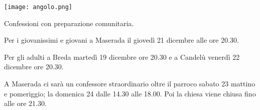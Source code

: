 \begin{minipage}{0.25\textwidth}
\texttt{[image: angolo.png]}
\end{minipage}
\hfill
\begin{minipage}{0.65\textwidth}
Confessioni con preparazione comunitaria.

Per i giovanissimi e giovani a Maserada il giovedì 21 dicembre alle ore 20.30.

Per gli adulti a Breda martedì 19 dicembre ore 20.30 e a Candelù venerdì 22 dicembre ore 20.30.

A Maserada ci sarà un confessore straordinario oltre il parroco sabato 23 mattino e pomeriggio; la domenica 24 dalle 14.30 alle 18.00. Poi la chiesa viene chiusa fino alle ore 21.30.
\end{minipage}
\normalsize
